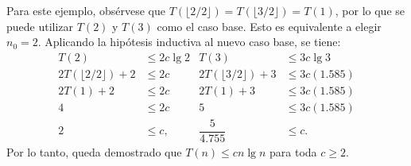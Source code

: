 \begin{expl}
\begin{description}
    Para este ejemplo, obsérvese que \(T(\lfloor2/2\rfloor)=T(\lfloor3/2\rfloor)=T(1)\), por lo que se puede utilizar \(T(2)\) y \(T(3)\) como el caso base. 
    Esto es equivalente a elegir \(n_0=2\).
    Aplicando la hipótesis inductiva al nuevo caso base, se tiene:
    \begin{align*}
      T(2) & \leq 2c\lg2 & T(3) & \leq 3c\lg3 \\
      2T(\lfloor 2/2 \rfloor) + 2 & \leq 2c & 2T(\lfloor 3/2 \rfloor) + 3 & \leq 3c(1.585) \\
      2T(1) + 2 & \leq2c & 2T(1) + 3 & \leq 3c(1.585) \\
      4 & \leq 2c & 5 & \leq 3c(1.585) \\
      2 & \leq c, & \dfrac{5}{4.755} & \leq c.
    \end{align*}
    Por lo tanto, queda demostrado que \(T(n)\leq cn\lg{n}\) para toda \(c\geq 2\). \exend
  \end{description}
\end{expl}

